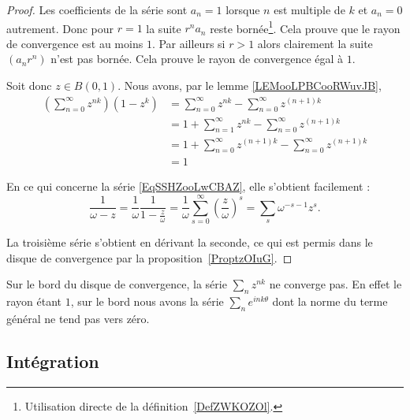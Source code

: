 \begin{proof}
	Les coefficients de la série sont \( a_n=1\) lorsque \( n\) est multiple de \( k\) et \( a_n=0\) autrement. Donc pour \( r=1\) la suite \( r^na_n\) reste bornée\footnote{Utilisation directe de la définition~\ref{DefZWKOZOl}.}. Cela prouve que le rayon de convergence est au moins \( 1\). Par ailleurs si \( r>1\) alors clairement la suite \( (a_nr^n)\) n'est pas bornée. Cela prouve le rayon de convergence égal à \( 1\).

	Soit donc \( z\in B(0,1)\). Nous avons, par le lemme \ref{LEMooLPBCooRWuvJB},
	\begin{subequations}
		\begin{align}
			\left( \sum_{n=0}^{\infty}z^{nk} \right)(1-z^k) & =\sum_{n=0}^{\infty}z^{nk}-\sum_{n=0}^{\infty}z^{(n+1)k}       \\
			                                                & =1+\sum_{n=1}^{\infty}z^{nk}-\sum_{n=0}^{\infty}z^{(n+1)k}     \\
			                                                & =1+\sum_{n=0}^{\infty}z^{(n+1)k}-\sum_{n=0}^{\infty}z^{(n+1)k} \\
			                                                & =1
		\end{align}
	\end{subequations}

	En ce qui concerne la série \eqref{EqSSHZooLwCBAZ}, elle s'obtient facilement :
	\begin{equation}
		\frac{1}{ \omega-z }=\frac{1}{  \omega }\frac{1}{ 1-\frac{ z }{ \omega } }=\frac{1}{ \omega }\sum_{s=0}^{\infty}\left( \frac{ z }{ \omega } \right)^s=\sum_s\omega^{-s-1}z^s.
	\end{equation}

	La troisième série s'obtient en dérivant la seconde, ce qui est permis dans le disque de convergence par la proposition~\ref{ProptzOIuG}.
\end{proof}

\begin{remark}
	Sur le bord du disque de convergence, la série \( \sum_nz^{nk}\) ne converge pas. En effet le rayon étant \( 1\), sur le bord nous avons la série \( \sum_n e^{ink\theta}\) dont la norme du terme général ne tend pas vers zéro.
\end{remark}

\subsection{Intégration}

